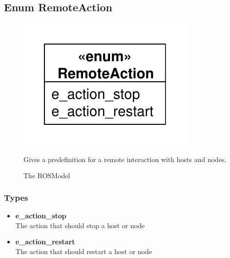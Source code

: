 \subsection{Enum RemoteAction}
\begin{figure}[htbp]
	\begin{minipage}[t]{7cm}
		\vspace{0pt}
		\centering
		\includegraphics[scale=0.6]{./diagram_pictures/RemoteAction.pdf}
		\caption{The ROSModel}
	\end{minipage}
	\hfill
	\begin{minipage}[t]{8cm}
		\vspace{10pt}
		Gives a predefinition for a remote interaction with hosts and nodes.
	\end{minipage}
\end{figure}  
\subsubsection{Types}
\begin{itemize}
	\item \textbf{e\_action\_stop}\\
	The action that should stop a host or node
	\item \textbf{e\_action\_restart}\\
	The action that should restart a host or node
\end{itemize}

\newpage
